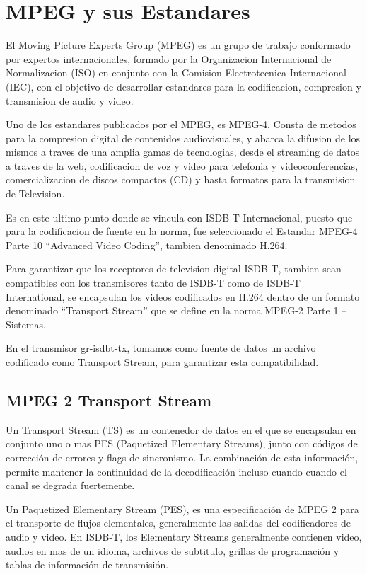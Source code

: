 \section{MPEG y sus Estandares}

El Moving Picture Experts Group (MPEG)\cite{MPEG} es un grupo de trabajo conformado por expertos internacionales, formado por la Organizacion Internacional de Normalizacion (ISO) en conjunto con la Comision Electrotecnica Internacional (IEC), con el objetivo de desarrollar estandares para la codificacion, compresion y transmision de audio y video.

Uno de los estandares publicados por el MPEG, es MPEG-4. Consta de metodos para la compresion digital de contenidos audiovisuales,  y abarca la difusion de los mismos a traves de una amplia gamas de tecnologias, desde el streaming de datos a traves de la web, codificacion de voz y video para telefonia y videoconferencias, comercializacion de discos compactos (CD) y hasta formatos para la transmision de Television. 

Es en este ultimo punto donde se vincula con ISDB-T Internacional, puesto que para la codificacion de fuente en la norma, fue seleccionado el Estandar MPEG-4 Parte 10 “Advanced Video Coding”, tambien denominado H.264.

Para garantizar que los receptores de television digital ISDB-T, tambien sean compatibles con los transmisores tanto de ISDB-T como de ISDB-T International, se encapsulan los videos codificados en H.264 dentro de un formato denominado “Transport Stream” que se define en la norma MPEG-2 Parte 1 – Sistemas.

En el transmisor gr-isdbt-tx, tomamos como fuente de datos un archivo codificado como Transport Stream, para garantizar esta compatibilidad.

	\subsection{MPEG 2 Transport Stream}
	
	Un Transport Stream (TS) es un contenedor de datos en el que se encapsulan en conjunto uno o mas PES (Paquetized Elementary Streams), junto con códigos de corrección de errores y flags de sincronismo. La combinación de esta información, permite mantener la continuidad de la decodificación incluso cuando cuando el canal se degrada fuertemente.
	
	Un Paquetized Elementary Stream (PES), es una especificación de MPEG 2 para el transporte de flujos elementales, generalmente las salidas del codificadores de audio y video. En ISDB-T, los Elementary Streams generalmente contienen video, audios en mas de un idioma, archivos de subtitulo, grillas de programación y tablas de información de transmisión.
	
